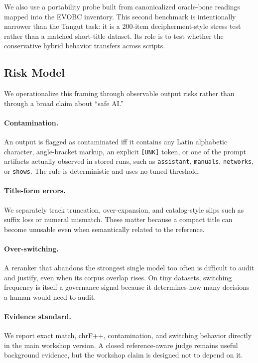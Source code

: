 \documentclass{article}
\begin{document}
We also use a portability probe built from canonicalized oracle-bone readings mapped into the EVOBC inventory. This second benchmark is intentionally narrower than the Tangut task: it is a 200-item decipherment-style stress test rather than a matched short-title dataset. Its role is to test whether the conservative hybrid behavior transfers across scripts.

\subsection{Risk Model}

We operationalize this framing through observable output risks rather than through a broad claim about ``safe AI.''

\paragraph{Contamination.} An output is flagged as contaminated iff it contains any Latin alphabetic character, angle-bracket markup, an explicit \texttt{[UNK]} token, or one of the prompt artifacts actually observed in stored runs, such as \texttt{assistant}, \texttt{manuals}, \texttt{networks}, or \texttt{shows}. The rule is deterministic and uses no tuned threshold.

\paragraph{Title-form errors.} We separately track truncation, over-expansion, and catalog-style slips such as suffix loss or numeral mismatch. These matter because a compact title can become unusable even when semantically related to the reference.

\paragraph{Over-switching.} A reranker that abandons the strongest single model too often is difficult to audit and justify, even when its corpus overlap rises. On tiny datasets, switching frequency is itself a governance signal because it determines how many decisions a human would need to audit.

\paragraph{Evidence standard.} We report exact match, chrF++, contamination, and switching behavior directly in the main workshop version. A closed reference-aware judge remains useful background evidence, but the workshop claim is designed not to depend on it.
\end{document}
